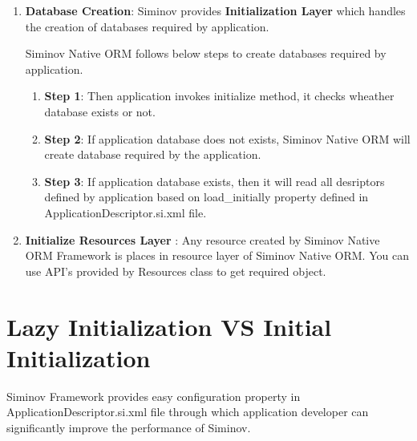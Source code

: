 	\begin{enumerate}

		\item \small \textbf{Database Creation}: Siminov provides \textbf{Initialization Layer} which handles the creation of databases required by application. 

		\par
		Siminov Native ORM follows below steps to create databases required by application.

		\begin{enumerate}

			\item \small \textbf{Step 1}: Then application invokes initialize method, it checks wheather database exists or not.

			\item \small \textbf{Step 2}: If application database does not exists, Siminov Native ORM will create database required by the application.

			\item \small \textbf{Step 3}: If application database exists, then it will read all desriptors defined by application based on load\_initially property defined in ApplicationDescriptor.si.xml file.

		\end{enumerate}

		
		\item \small \textbf{Initialize Resources Layer}	: Any resource created by Siminov Native ORM Framework is places in resource layer of Siminov Native ORM. You can use API's provided by Resources class to get required object.
			
			


	\end{enumerate}



\section{Lazy Initialization VS Initial Initialization}

Siminov Framework provides easy configuration property in ApplicationDescriptor.si.xml file through which application developer can significantly improve the performance of Siminov. 


